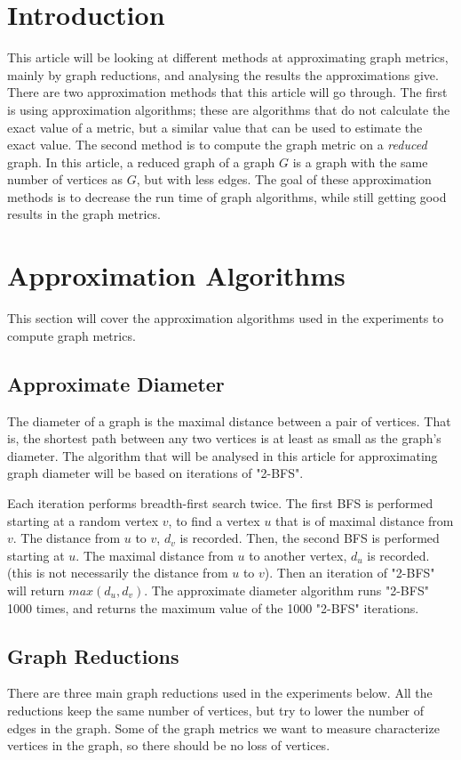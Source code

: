 \documentclass[11pt]{article}
\begin{document}
\section{Introduction}
This article will be looking at different methods at approximating graph metrics, mainly by graph reductions, and analysing the results the approximations give.  There are two approximation methods that this article will go through.  The first is using approximation algorithms; these are algorithms that do not calculate the exact value of a metric, but a similar value that can be used to estimate the exact value.  The second method is to compute the graph metric on a \textit{reduced} graph. In this article, a reduced graph of a graph $G$ is a graph with the same number of vertices as $G$, but with less edges.  The goal of these approximation methods is to decrease the run time of graph algorithms, while still getting good results in the graph metrics.

\section{Approximation Algorithms}
This section will cover the approximation algorithms used in the experiments to compute graph metrics.
\subsection{Approximate Diameter} 
The diameter of a graph is the maximal distance between a pair of vertices.  That is, the shortest path between any two vertices is at least as small as the graph's diameter.  The algorithm that will be analysed in this article for approximating graph diameter will be based on iterations of "2-BFS".  

Each iteration performs breadth-first search twice.  The first BFS is performed starting at a random vertex $v$, to find a vertex $u$ that is of maximal distance from $v$.  The distance from $u$ to $v$, $d_v$ is recorded.  Then, the second BFS is performed starting at $u$.  The maximal distance from $u$ to another vertex, $d_u$ is recorded. (this is not necessarily the distance from $u$ to $v$).  Then an iteration of "2-BFS" will return $max(d_u, d_v)$.  The approximate diameter algorithm runs "2-BFS" 1000 times, and returns the maximum value of the 1000 "2-BFS" iterations.

\subsection{Graph Reductions}
There are three main graph reductions used in the experiments below.  All the reductions keep the same number of vertices, but try to lower the number of edges in the graph.  Some of the graph metrics we want to measure characterize vertices in the graph, so there should be no loss of vertices.  
\end{document}
